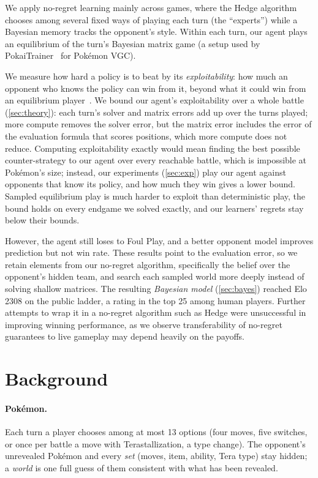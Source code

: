\documentclass[10pt]{article}
\theoremstyle{tplain}
\theoremstyle{tdef}
\theoremstyle{trem}
\begin{document}
We apply no-regret learning mainly across games, where the Hedge algorithm chooses among several fixed ways of playing each turn (the ``experts'') while a Bayesian memory tracks the opponent's style. Within each turn, our agent plays an equilibrium of the turn's Bayesian matrix game (a setup used by PokaiTrainer~\cite{Yu26} for Pok\'emon VGC).

We measure how hard a policy is to beat by its \emph{exploitability}: how much an opponent who knows the policy can win from it, beyond what it could win from an equilibrium player~\cite{GS15}. We bound our agent's exploitability over a whole battle (\cref{sec:theory}): each turn's solver and matrix errors add up over the turns played; more compute removes the solver error, but the matrix error includes the error of the evaluation formula that scores positions, which more compute does not reduce. Computing exploitability exactly would mean finding the best possible counter-strategy to our agent over every reachable battle, which is impossible at Pok\'emon's size; instead, our experiments (\cref{sec:exp}) play our agent against opponents that know its policy, and how much they win gives a lower bound. Sampled equilibrium play is much harder to exploit than deterministic play, the bound holds on every endgame we solved exactly, and our learners' regrets stay below their bounds.

However, the agent still loses to Foul Play, and a better opponent model improves prediction but not win rate. These results point to the evaluation error, so we retain elements from our no-regret algorithm, specifically the belief over the opponent's hidden team, and search each sampled world more deeply instead of solving shallow matrices. The resulting \emph{Bayesian model} (\cref{sec:bayes}) reached Elo 2308 on the public ladder, a rating in the top 25 among human players. Further attempts to wrap it in a no-regret algorithm such as Hedge were unsuccessful in improving winning performance, as we observe transferability of no-regret guarantees to live gameplay may depend heavily on the payoffs.

\section{Background}
\label{sec:prelim}
\paragraph{Pok\'emon.} Each turn a player chooses among at most 13 options (four moves, five switches, or once per battle a move with Terastallization, a type change). The opponent's unrevealed Pok\'emon and every \emph{set} (moves, item, ability, Tera type) stay hidden; a \emph{world} is one full guess of them consistent with what has been revealed.
\end{document}
